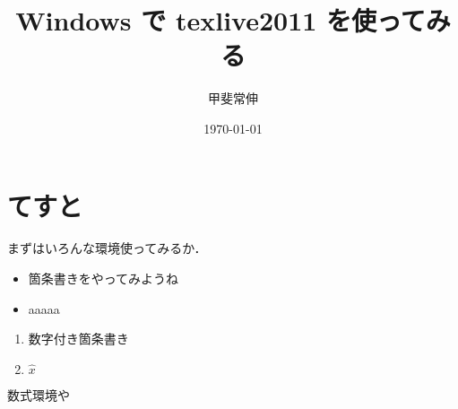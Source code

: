 \documentclass[a4j, 10pt, fleqn, twocolumn]{jsarticle}
\title{Windows で texlive2011 を使ってみる}
\author{甲斐常伸}
\date{\today}
\begin{document}
\maketitle
\section{てすと}
まずはいろんな環境使ってみるか．
\begin{itemize}
 \item 箇条書きをやってみようね
 \item aaaaa
\end{itemize}
\begin{enumerate}
 \item 数字付き箇条書き
 \item $\hat{x}$
\end{enumerate}
数式環境や
\end{document}
